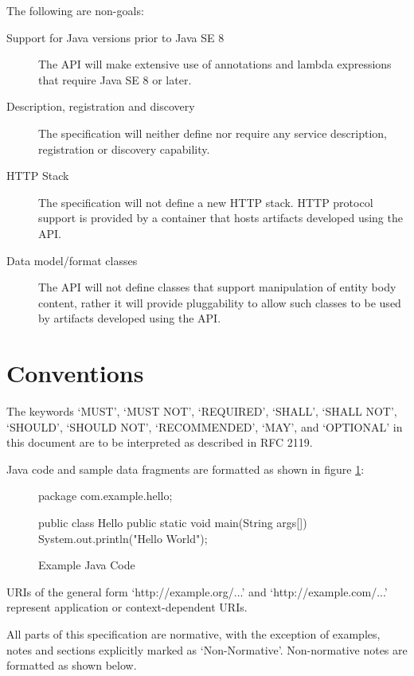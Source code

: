 The following are non-goals:

\begin{description}

\item[Support for Java versions prior to Java SE 8] The API will make extensive use of annotations and lambda expressions that require Java SE 8 or later.

\item[Description, registration and discovery] The specification will neither define nor require any service description, registration or discovery capability.

\item[HTTP Stack] The specification will not define a new HTTP stack. HTTP protocol support is provided by a container that hosts artifacts developed using the API.

\item[Data model/format classes] The API will not define classes that support manipulation of entity body content, rather it will provide pluggability to allow such classes to be used by artifacts developed using the API.

\end{description}

\section{Conventions}

The keywords `MUST', `MUST NOT', `REQUIRED', `SHALL', `SHALL NOT', `SHOULD', `SHOULD NOT', `RECOMMENDED', `MAY', and `OPTIONAL' in this document are to be interpreted as described in RFC 2119\cite{rfc2119}. 

Java code and sample data fragments are formatted as shown in figure \ref{ex1}:

\begin{figure}[hbtp]
\caption{Example Java Code}
\label{ex1}
\begin{listing}{1}
package com.example.hello;

public class Hello {
    public static void main(String args[]) {
        System.out.println("Hello World");
    }
}\end{listing}
\end{figure}

URIs of the general form `http://example.org/...' and `http://example.com/...' represent application or context-dependent URIs.

All parts of this specification are normative, with the exception of examples, notes and sections explicitly marked as `Non-Normative'. Non-normative notes are formatted as shown below.

